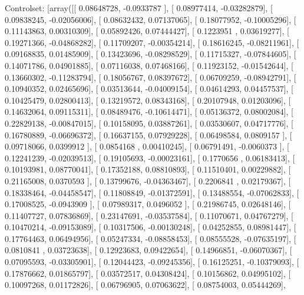 \documentclass{article}
\begin{document}
Controlset: [array([[ 0.08648728, -0.0933787 ],
       [ 0.08977414, -0.03282879],
       [ 0.09838245, -0.02056006],
       [ 0.08632432,  0.07137065],
       [ 0.18077952, -0.10005296],
       [ 0.11143863,  0.00310309],
       [ 0.05892426,  0.07444427],
       [ 0.1223951 ,  0.03619277],
       [ 0.19271366, -0.04868282],
       [ 0.11709207, -0.00354214],
       [ 0.18616245, -0.08211961],
       [ 0.09168835,  0.01485909],
       [ 0.13423696, -0.08298529],
       [ 0.11715327, -0.07844605],
       [ 0.14071786,  0.04901885],
       [ 0.07116038,  0.07468166],
       [ 0.11923152, -0.01542644],
       [ 0.13660302, -0.11283794],
       [ 0.18056767,  0.08397672],
       [ 0.06709259, -0.08942791],
       [ 0.10940352,  0.02465696],
       [ 0.03513644, -0.04009154],
       [ 0.04614293,  0.04457537],
       [ 0.10425479,  0.02800413],
       [ 0.13219572,  0.08343168],
       [ 0.20107948,  0.01203096],
       [ 0.14632064,  0.09115311],
       [ 0.08489476, -0.10614471],
       [ 0.05136372,  0.08002084],
       [ 0.22829138, -0.00847015],
       [ 0.10158095,  0.03887261],
       [ 0.03530607,  0.04717776],
       [ 0.16780889, -0.06696372],
       [ 0.16637155,  0.07929228],
       [ 0.06498584,  0.0809157 ],
       [ 0.09718066,  0.0399912 ],
       [ 0.0854168 ,  0.00410245],
       [ 0.06791491, -0.0060373 ],
       [ 0.12241239, -0.02039513],
       [ 0.19105693, -0.00023161],
       [ 0.1770656 ,  0.06183413],
       [ 0.10193981,  0.08770041],
       [ 0.17352188,  0.08810893],
       [ 0.11510401,  0.00229882],
       [ 0.21165008,  0.0370593 ],
       [ 0.13799676, -0.04363467],
       [ 0.2206841 ,  0.02179367],
       [ 0.18338464, -0.04458547],
       [ 0.11808849, -0.01372591],
       [ 0.13488554, -0.07062833],
       [ 0.17008525, -0.0943909 ],
       [ 0.07989317,  0.0496052 ],
       [ 0.21986745,  0.02648146],
       [ 0.11407727,  0.07836869],
       [ 0.23147691, -0.03537584],
       [ 0.11070671,  0.04767279],
       [ 0.10470214, -0.09153089],
       [ 0.10317506, -0.00130248],
       [ 0.04252855,  0.08981447],
       [ 0.17764463,  0.06494956],
       [ 0.05247334, -0.08858453],
       [ 0.08555528, -0.07635197],
       [ 0.0810841 ,  0.03723638],
       [ 0.12923683,  0.09422654],
       [ 0.14966851, -0.06070367],
       [ 0.07095593, -0.03305901],
       [ 0.12044423, -0.09245356],
       [ 0.16125251, -0.10379093],
       [ 0.17876662,  0.01865797],
       [ 0.03572517,  0.04308424],
       [ 0.10156862,  0.04995102],
       [ 0.10097268,  0.01172826],
       [ 0.06796905,  0.07063622],
       [ 0.08754003,  0.05444269],
\end{document}
